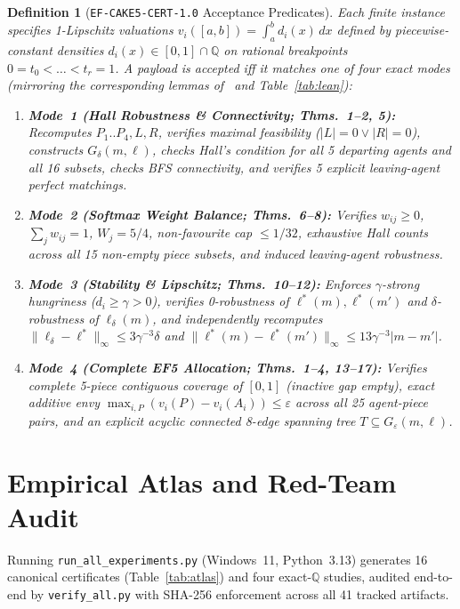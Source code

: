 \documentclass[10pt,twocolumn]{article}
\newtheorem{definition}{Definition}
\newcommand{\QQ}{\mathbb{Q}}
\newcommand{\ellv}{\boldsymbol{\ell}}
\begin{document}
\begin{definition}[\texttt{EF-CAKE5-CERT-1.0} Acceptance Predicates]\label{def:modes}
Each finite instance specifies 1-Lipschitz valuations $v_i([a,b]) = \int_a^b d_i(x)\,dx$ defined by piecewise-constant densities $d_i(x) \in [0, 1] \cap \QQ$ on rational breakpoints $0 = t_0 < \dots < t_r = 1$. A payload is accepted iff it matches one of four exact modes (mirroring the corresponding lemmas of~\cite{filosratsikas2026envyfree5} and Table~\ref{tab:lean}):
\begin{enumerate}[leftmargin=*,nosep]
  \item \textbf{Mode~1 (Hall Robustness \& Connectivity; Thms.~1--2, 5):} Recomputes $P_1..P_4, L, R$, verifies maximal feasibility ($|L|=0 \lor |R|=0$), constructs $G_\delta(m,\ellv)$, checks Hall's condition for all 5 departing agents and all 16 subsets, checks BFS connectivity, and verifies 5 explicit leaving-agent perfect matchings.
  \item \textbf{Mode~2 (Softmax Weight Balance; Thms.~6--8):} Verifies $w_{ij} \ge 0$, $\sum_j w_{ij} = 1$, $W_j = 5/4$, non-favourite cap $\le 1/32$, exhaustive Hall counts across all 15 non-empty piece subsets, and induced leaving-agent robustness.
  \item \textbf{Mode~3 (Stability \& Lipschitz; Thms.~10--12):} Enforces $\gamma$-strong hungriness ($d_i \ge \gamma > 0$), verifies 0-robustness of $\ellv^*(m), \ellv^*(m')$ and $\delta$-robustness of $\ellv_\delta(m)$, and independently recomputes $\|\ellv_\delta - \ellv^*\|_\infty \le 3\gamma^{-3}\delta$ and $\|\ellv^*(m) - \ellv^*(m')\|_\infty \le 13\gamma^{-3}|m - m'|$.
  \item \textbf{Mode~4 (Complete EF5 Allocation; Thms.~1--4, 13--17):} Verifies complete 5-piece contiguous coverage of $[0, 1]$ (inactive gap empty), exact additive envy $\max_{i,P} (v_i(P) - v_i(A_i)) \le \varepsilon$ across all 25 agent-piece pairs, and an explicit acyclic connected 8-edge spanning tree $T \subseteq G_\varepsilon(m, \ellv)$.
\end{enumerate}
\end{definition}

\section{Empirical Atlas and Red-Team Audit}\label{sec:results}
Running \texttt{run\_all\_experiments.py} (Windows~11, Python~3.13) generates 16 canonical certificates (Table~\ref{tab:atlas}) and four exact-$\QQ$ studies, audited end-to-end by \texttt{verify\_all.py} with SHA-256 enforcement across all 41 tracked artifacts.
\end{document}
